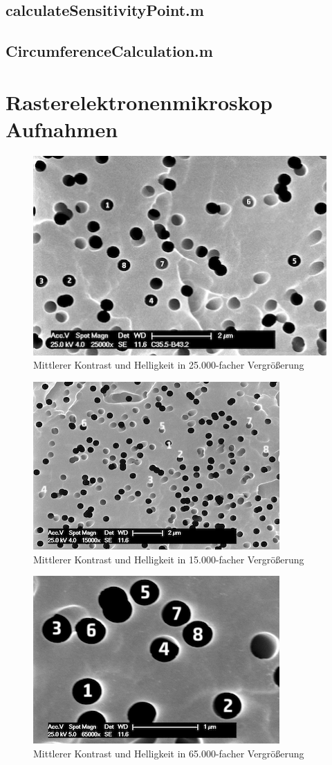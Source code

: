 \documentclass[accentcolor=tud1c, 11pt, toc=bib, toc=listof, captions=abovetable, parskip=half]{tudreport}
\begin{document}
\section{calculateSensitivityPoint.m}
\label{code:sensitivity}


\section{CircumferenceCalculation.m}


\chapter{Rasterelektronenmikroskop Aufnahmen}
\begin{figure}
\centering
	\includegraphics[scale=1.5]{Figures/115_numbered.png}
\caption{Mittlerer Kontrast und Helligkeit in 25.000-facher Vergrößerung}
\label{fig:appendix1}
\end{figure}
\hfill
\begin{figure}
\centering
	\includegraphics[scale=1.8]{Figures/101_numbered.png}
\caption{Mittlerer Kontrast und Helligkeit in 15.000-facher Vergrößerung}
\label{fig:appendix2}
\end{figure}
\hfill
\begin{figure}
\centering
	\includegraphics[scale=1.8]{Figures/100_numbered.png}
\caption{Mittlerer Kontrast und Helligkeit in 65.000-facher Vergrößerung}
\label{fig:appendix3}
\end{figure}
\end{document}
